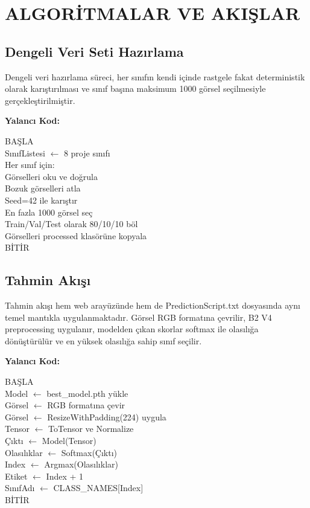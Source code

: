 \documentclass[conference]{IEEEtran}
\begin{document}
\section{ALGORİTMALAR VE AKIŞLAR}

\subsection{Dengeli Veri Seti Hazırlama}

Dengeli veri hazırlama süreci, her sınıfın kendi içinde rastgele fakat
deterministik olarak karıştırılması ve sınıf başına maksimum 1000 görsel
seçilmesiyle gerçekleştirilmiştir.

\noindent\textbf{Yalancı Kod:}
\begin{flushleft}
\ttfamily
BAŞLA \\
SınıfListesi $\leftarrow$ 8 proje sınıfı \\
Her sınıf için: \\
\hspace*{1em} Görselleri oku ve doğrula \\
\hspace*{1em} Bozuk görselleri atla \\
\hspace*{1em} Seed=42 ile karıştır \\
\hspace*{1em} En fazla 1000 görsel seç \\
\hspace*{1em} Train/Val/Test olarak 80/10/10 böl \\
\hspace*{1em} Görselleri processed klasörüne kopyala \\
BİTİR
\end{flushleft}
\normalfont

\subsection{Tahmin Akışı}

Tahmin akışı hem web arayüzünde hem de PredictionScript.txt dosyasında aynı
temel mantıkla uygulanmaktadır. Görsel RGB formatına çevrilir, B2 V4
preprocessing uygulanır, modelden çıkan skorlar softmax ile olasılığa
dönüştürülür ve en yüksek olasılığa sahip sınıf seçilir.

\noindent\textbf{Yalancı Kod:}
\begin{flushleft}
\ttfamily
BAŞLA \\
Model $\leftarrow$ best\_model.pth yükle \\
Görsel $\leftarrow$ RGB formatına çevir \\
Görsel $\leftarrow$ ResizeWithPadding(224) uygula \\
Tensor $\leftarrow$ ToTensor ve Normalize \\
Çıktı $\leftarrow$ Model(Tensor) \\
Olasılıklar $\leftarrow$ Softmax(Çıktı) \\
Index $\leftarrow$ Argmax(Olasılıklar) \\
Etiket $\leftarrow$ Index + 1 \\
SınıfAdı $\leftarrow$ CLASS\_NAMES[Index] \\
BİTİR
\end{flushleft}
\normalfont
\end{document}
